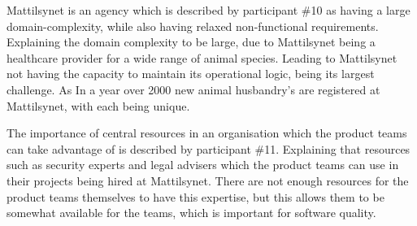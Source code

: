 
Mattilsynet is an agency which is described by participant \#10 as having a large domain-complexity, while also having relaxed non-functional requirements. Explaining the domain complexity to be large, due to Mattilsynet being a healthcare provider for a wide range of animal species. Leading to Mattilsynet not having the capacity to maintain its operational logic, being its largest challenge. As In a year over 2000 new animal husbandry's are registered at Mattilsynet, with each being unique.


The importance of central resources in an organisation which the product teams can take advantage of is described by participant \#11. Explaining that resources such as security experts and legal advisers which the product teams can use in their projects being hired at Mattilsynet. There are not enough resources for the product teams themselves to have this expertise, but this allows them to be somewhat available for the teams, which is important for software quality.



